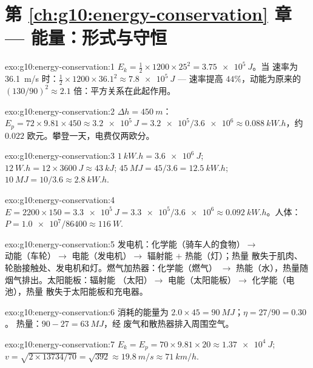 \section*{第 \ref{ch:g10:energy-conservation} 章 --- 能量：形式与守恒}

\begin{solution}{exo:g10:energy-conservation:1}
$E_k = \tfrac12 \times 1200 \times 25^2 = \qty{3.75e5}{J}$。当
速率为 \qty{36.1}{m/s} 时：$\tfrac12 \times 1200 \times 36.1^2 \approx
\qty{7.8e5}{J}$ --- 速率提高 $44\%$，动能为原来的 $(130/90)^2 \approx 2.1$
倍：平方关系在此起作用。
\end{solution}

\begin{solution}{exo:g10:energy-conservation:2}
$\Delta h = \qty{450}{m}$：
$E_p = 72 \times 9.81 \times 450 \approx \qty{3.2e5}{J}
= \num{3.2e5}/\num{3.6e6} \approx \qty{0.088}{kW.h}$，约 
$0.022$ 欧元。攀登一天，电费仅两欧分。
\end{solution}

\begin{solution}{exo:g10:energy-conservation:3}
$\qty{1}{kW.h} = \qty{3.6e6}{J}$;
$\qty{12}{W.h} = 12 \times \qty{3600}{J} \approx \qty{43}{kJ}$;
$\qty{45}{MJ} = 45/3.6 = \qty{12.5}{kW.h}$;
$\qty{10}{MJ} = 10/3.6 \approx \qty{2.8}{kW.h}$.
\end{solution}

\begin{solution}{exo:g10:energy-conservation:4}
$E = 2200 \times 150 = \qty{3.3e5}{J}
= \num{3.3e5}/\num{3.6e6} \approx \qty{0.092}{kW.h}$。人体：
$P = \num{1.0e7}/\num{86400} \approx \qty{116}{W}$.
\end{solution}

\begin{solution}{exo:g10:energy-conservation:5}
发电机：化学能（骑车人的食物）$\to$ 动能（车轮）$\to$
电能（发电机）$\to$ 辐射能 $+$ 热能（灯）；热量
散失于肌肉、轮胎接触处、发电机和灯。燃气加热器：化学能（燃气）
$\to$ 热能（水），热量随烟气排出。太阳能板：辐射能
（太阳）$\to$ 电能（太阳能板）$\to$ 化学能（电池），热量
散失于太阳能板和充电器。
\end{solution}

\begin{solution}{exo:g10:energy-conservation:6}
消耗的能量为 $2.0 \times 45 = \qty{90}{MJ}$；$\eta = 27/90 = 0.30$。
热量：$90 - 27 = \qty{63}{MJ}$，经
废气和散热器排入周围空气。
\end{solution}

\begin{solution}{exo:g10:energy-conservation:7}
$E_k = E_p = 70 \times 9.81 \times 20 \approx \qty{1.37e4}{J}$;
$v = \sqrt{2 \times 13734/70} = \sqrt{392} \approx \qty{19.8}{m/s}
\approx \qty{71}{km/h}$.
\end{solution}

